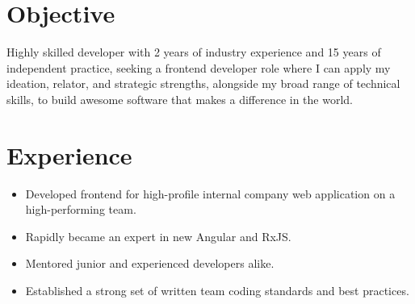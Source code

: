 \documentclass[11pt, a4paper]{article}
\begin{document}


\section*{Objective}
\vspace{-0.05in}
\hspace*{0.04in}
\begin{minipage}{0.97\textwidth}
  Highly skilled developer with 2 years of industry experience and 15 years of
  independent practice, seeking a frontend developer role where I can apply my
  ideation, relator, and strategic strengths, alongside my broad range of technical
  skills, to build awesome software that makes a difference in the world.
\end{minipage}
\vspace{-0.15in}

\section*{Experience}
\vspace{-0.05in}


\noindent
{
  \hfill
}

\noindent
{
  \hfill
}
\vspace{-0.08in}
\begin{itemize}
  \item Developed frontend for high-profile internal company web application on a high-performing team.
        \vspace{-0.1in}
  \item Rapidly became an expert in new Angular and RxJS.
        \vspace{-0.1in}
  \item Mentored junior and experienced developers alike.
        \vspace{-0.1in}
  \item Established a strong set of written team coding standards and best practices.
\end{itemize}
\vspace{-0.05in}
\end{document}
